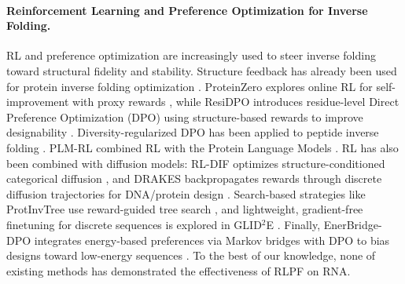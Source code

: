 \paragraph{Reinforcement Learning and Preference Optimization for Inverse Folding.}
RL and preference optimization are increasingly used to steer inverse folding toward structural fidelity and stability. Structure feedback has already been used for protein inverse folding optimization \citep{xu2025proteininversefoldingstructure}. ProteinZero explores online RL for self-improvement with proxy rewards \citep{wang2025proteinzero}, while ResiDPO introduces residue-level Direct Preference Optimization (DPO) using structure-based rewards to improve designability \citep{xue2025improving}. Diversity-regularized DPO has been applied to peptide inverse folding \citep{park2024improving}. PLM-RL combined RL with the Protein Language Models \citep{cao2025supervisionexplorationdoesprotein}. RL has also been combined with diffusion models: RL-DIF optimizes structure-conditioned categorical diffusion \citep{ektefaie2024reinforcement}, and DRAKES backpropagates rewards through discrete diffusion trajectories for DNA/protein design \citep{wang2024fine}. Search-based strategies like ProtInvTree use reward-guided tree search \citep{liu2025protinvtree}, and lightweight, gradient-free finetuning for discrete sequences is explored in GLID$^2$E \citep{cao2025glid}. Finally, EnerBridge-DPO integrates energy-based preferences via Markov bridges with DPO to bias designs toward low-energy sequences \citep{rong2025enerbridge}. To the best of our knowledge, none of existing methods has demonstrated the effectiveness of RLPF on RNA.